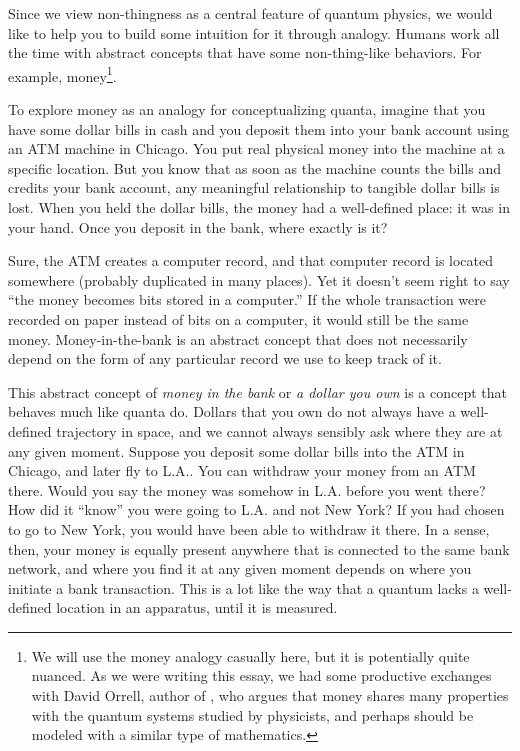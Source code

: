 \documentclass[12pt,onecolumn,preprintnumbers,amsmath,amssymbn,reprint,nofootinbib,superscriptaddress]{revtex4}    %
\begin{document}
Since we view non-thingness as a central feature of quantum physics, we would like to help you to build some intuition for it through analogy.  Humans work all the time with abstract concepts that have some non-thing-like behaviors. For example, money\footnote{We will use the money analogy casually here, but it is potentially quite nuanced. As we were writing this essay, we had some productive exchanges with David Orrell, author of \cite{orrell}, who argues that money shares many properties with the quantum systems studied by physicists, and perhaps should be modeled with a similar type of mathematics.}.

To explore money as an analogy for conceptualizing quanta, imagine that you have some dollar bills in cash and you deposit them into your bank account using an ATM machine in Chicago.  You put real physical money into the machine at a specific location.  But you know that as soon as the machine counts the bills and credits your bank account, any meaningful relationship to tangible dollar bills is lost.  When you held the dollar bills, the money had a well-defined place:  it was in your hand.  Once you deposit in the bank, where exactly is it?

Sure, the ATM creates a computer record, and that computer record is located somewhere (probably duplicated in many places).  Yet it doesn't seem right to say ``the money becomes bits stored in a computer.''  If the whole transaction were recorded on paper instead of bits on a computer, it would still be the same money.  Money-in-the-bank is an abstract concept that does not necessarily depend on the form of any particular record we use to keep track of it.  

This abstract concept of {\em money in the bank} or {\em a dollar you own} is a concept that behaves much like quanta do.  Dollars that you own do not always have a well-defined trajectory in space, and we cannot always sensibly ask where they are at any given moment.  Suppose you deposit some dollar bills into the ATM in Chicago, and later fly to L.A..  You can withdraw your money from an ATM there.  Would you say the money was somehow in L.A. before you went there?  How did it ``know'' you were going to L.A. and not New York?  If you had chosen to go to New York, you would have been able to withdraw it there.  In a sense, then, your money is equally present anywhere that is connected to the same bank network, and where you find it at any given moment depends on where you initiate a bank transaction.  This is a lot like the way that a quantum lacks a well-defined location in an apparatus, until it is measured.  
\end{document}
